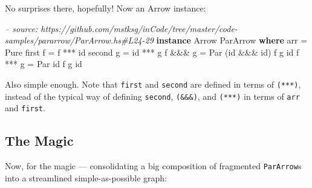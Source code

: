 \documentclass[]{article}
\newenvironment{Shaded}{}{}
\newcommand{\KeywordTok}[1]{\textcolor[rgb]{0.00,0.44,0.13}{\textbf{{#1}}}}
\newcommand{\DataTypeTok}[1]{\textcolor[rgb]{0.56,0.13,0.00}{{#1}}}
\newcommand{\CommentTok}[1]{\textcolor[rgb]{0.38,0.63,0.69}{\textit{{#1}}}}
\newcommand{\FunctionTok}[1]{\textcolor[rgb]{0.02,0.16,0.49}{{#1}}}
\newcommand{\NormalTok}[1]{{#1}}
\begin{document}
No surprises there, hopefully! Now an Arrow instance:

\begin{Shaded}
\begin{Highlighting}[]
\CommentTok{-- source: https://github.com/mstksg/inCode/tree/master/code-samples/pararrow/ParArrow.hs#L24-29}
\KeywordTok{instance} \DataTypeTok{Arrow} \DataTypeTok{ParArrow} \KeywordTok{where}
    \NormalTok{arr      }\FunctionTok{=} \DataTypeTok{Pure}
    \NormalTok{first f  }\FunctionTok{=} \NormalTok{f  }\FunctionTok{***} \NormalTok{id}
    \NormalTok{second g }\FunctionTok{=} \NormalTok{id }\FunctionTok{***} \NormalTok{g}
    \NormalTok{f }\FunctionTok{&&&} \NormalTok{g  }\FunctionTok{=} \DataTypeTok{Par} \NormalTok{(id }\FunctionTok{&&&} \NormalTok{id) f g id}
    \NormalTok{f }\FunctionTok{***} \NormalTok{g  }\FunctionTok{=} \DataTypeTok{Par} \NormalTok{id          f g id}
\end{Highlighting}
\end{Shaded}

Also simple enough. Note that \texttt{first} and \texttt{second} are defined in
terms of \texttt{(***)}, instead of the typical way of defining \texttt{second},
\texttt{(\&\&\&)}, and \texttt{(***)} in terms of \texttt{arr} and
\texttt{first}.

\subsection{The Magic}\label{the-magic}

Now, for the magic --- consolidating a big composition of fragmented
\texttt{ParArrow}s into a streamlined simple-as-possible graph:
\end{document}
